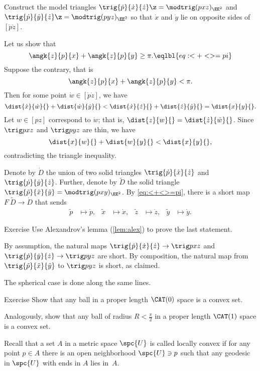 Construct  the model triangles $\trig{\dot p}{\dot x}{\dot z}\z=\modtrig(p x z)_{\EE^2}$ 
and $\trig {\dot p} {\dot y} {\dot z}\z=\modtrig(p y z)_{\EE^2}$ so that $\dot x$ and $\dot y$ lie on opposite sides of $[\dot p\dot z]$.

Let us show that 
\[\angk{z}{p}{x}+\angk{z}{p}{y}
\ge
\pi.
\eqlbl{eq:<+<>=pi}\]
Suppose the contrary, that is
\[\angk{z}{p}{x}+\angk{z}{p}{y}
<
\pi.\]
Then for some point $\dot w\in[\dot p\dot z]$, we have \[\dist{\dot x}{\dot w}{}+\dist{\dot w}{\dot y}{}
<
\dist{\dot x}{\dot z}{}+\dist{\dot z}{\dot y}{}=\dist{x}{y}{}.\]
Let $w\in[p z]$ correspond to $\dot w$; that is, $\dist{z}{w}{}=\dist{\dot z}{\dot w}{}$. 
Since $\trig p x z$ and $\trig p y z$ are thin, we have 
\[\dist{x}{w}{}+\dist{w}{y}{}<\dist{x}{y}{},\]
contradicting the triangle inequality. 

Denote by $\dot D$ the union of two solid triangles $\trig {\dot p}{\dot x}{\dot z}$ and $\trig {\dot p} {\dot y} {\dot z}$.
Further, denote by $\tilde D$ the solid triangle $\trig{\tilde  p}{\tilde  x}{\tilde  y}=\modtrig(p x y)_{\EE^2}$.
By \ref{eq:<+<>=pi}, there is a short map $F\:\tilde D\to \dot D$ that sends 
\begin{align*}
\tilde p&\mapsto \dot p,
&
\tilde x&\mapsto \dot x,
&
\tilde z&\mapsto \dot z,
&
\tilde y&\mapsto \dot y.
\end{align*}
\qedsf

\begin{thm}{Exercise}\label{ex:short-map}
Use Alexandrov's lemma (\ref{lem:alex}) to prove the last statement. 
\end{thm}


By assumption, the natural maps $\trig {\dot p} {\dot x} {\dot z}\to\trig p x z$ and $\trig {\dot p} {\dot y} {\dot z}\to\trig p y z$ are short.  
By composition,  the natural map from $\trig{\tilde  p}{\tilde  x}{\tilde  y}$ to $\trig p y z$ is short, as claimed.

The spherical case is done along the same lines.
\qeds

\begin{thm}{Exercise}\label{ex:convex-balls}
Show that any ball in a proper length $\CAT(0)$ space is a convex set.

Analogously, show that any ball of radius $R<\tfrac\pi2$ in a proper length $\CAT(1)$ space  is a convex set.
\end{thm}

Recall that a set $A$ in a metric space $\spc{U}$ is called locally convex if for any point $p\in A$ there is an open neighborhood $\spc{U}\ni p$ such that any geodesic in $\spc{U}$ with  ends in $A$ lies in~$A$. 

